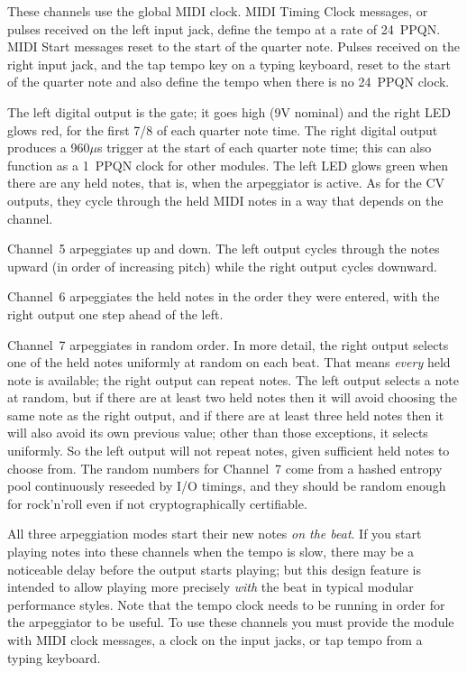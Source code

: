 These channels use the global MIDI clock.  MIDI Timing Clock messages, or
pulses received on the left input jack, define the tempo at a rate of
24~PPQN.  MIDI Start messages reset to the start of the quarter note. 
Pulses received on the right input jack, and the tap tempo key on a typing
keyboard, reset to the start of the quarter note and also define the tempo
when there is no 24~PPQN clock.

The left digital output is the gate; it goes high (9V nominal) and the right
LED glows red, for the first 7/8 of each quarter note time.  The right
digital output produces a 960$\mu$s trigger at the start of each quarter
note time; this can also function as a 1~PPQN clock for other modules.  The
left LED glows green when there are any held notes, that is, when the
arpeggiator is active.  As for the CV outputs, they cycle through the held
MIDI notes in a way that depends on the channel.

Channel~5 arpeggiates up and down.  The left output cycles through the notes
upward (in order of increasing pitch) while the right output cycles
downward.

Channel~6 arpeggiates the held notes in the order they were entered, with
the right output one step ahead of the left.

Channel~7 arpeggiates in random order.  In more detail, the right output
selects one of the held notes uniformly at random on each beat.  That means
\emph{every} held note is available; the right output can repeat notes.  The
left output selects a note at random, but if there are at least two held
notes then it will avoid choosing the same note as the right output, and if
there are at least three held notes then it will also avoid its own previous
value; other than those exceptions, it selects uniformly.  So the left
output will not repeat notes, given sufficient held notes to choose from. 
The random numbers for Channel~7 come from a hashed entropy pool
continuously reseeded by I/O timings, and they should be random enough for
rock'n'roll even if not cryptographically certifiable.

All three arpeggiation modes start their new notes \emph{on the beat}.  If
you start playing notes into these channels when the tempo is slow, there
may be a noticeable delay before the output starts playing; but this design
feature is intended to allow playing more precisely \emph{with} the beat in
typical modular performance styles.  Note that the tempo clock needs to be
running in order for the arpeggiator to be useful.  To use these channels
you must provide the module with MIDI clock messages, a clock on the input
jacks, or tap tempo from a typing keyboard.

